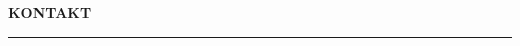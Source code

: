 \vspace{0pt}
{\LARGE\bfseries\raggedright \Name\par}

\vspace{0.2cm}
{\normalsize \Title}

\vspace{0.35cm}
{\small\bfseries\MakeUppercase{Kontakt}}\\[-0.1cm]%
\rule{\linewidth}{0.4pt}%
\vspace{0.15cm}

{\small
\Address\\[4pt]
\Phone\\[4pt]
\Email
}
